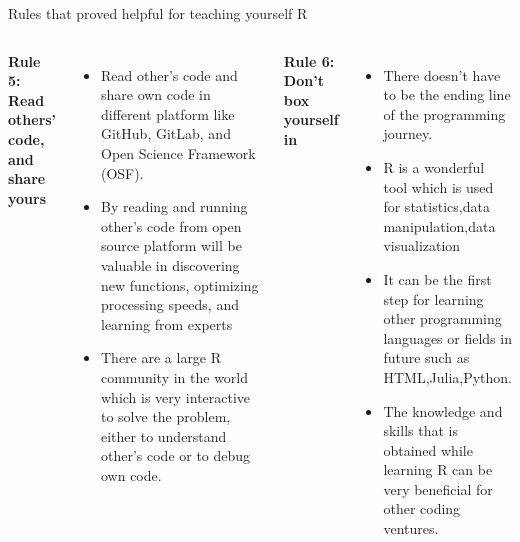 \documentclass{beamer}
\begin{document}
 \begin{frame}[t]{Rules that proved helpful for teaching yourself R}
		\scriptsize
		
		\begin{columns}[t] 
			 {\textbf{Rule 5: Read others’ code, and share yours}}
			\begin{itemize}
				\item Read other’s code and share own code in different platform like GitHub, GitLab, and Open Science Framework (OSF).
				\item   By reading and running other’s code from open source platform will be valuable in discovering new functions, optimizing processing speeds, and learning from experts
				\item   There are a large R community in the world which is very interactive to solve the problem, either to understand other’s code or to debug own code. 
				
			\end{itemize}
			
			 {\textbf{Rule 6: Don’t box yourself in}}
			\begin{itemize}
				
				\item   There doesn't have to be the ending line of the programming 
				journey.
				\item R is a wonderful tool which is used for statistics,data manipulation,data 
				visualization
				\item   It can be the first step for learning other programming languages or fields 
				in future such as HTML,Julia,Python.
				\item  The knowledge and skills that is obtained 
				while learning R can be very beneficial for other coding ventures.
			
			\end{itemize}	
			
		\end{columns}
	
   \end{frame}
	
\end{document}
